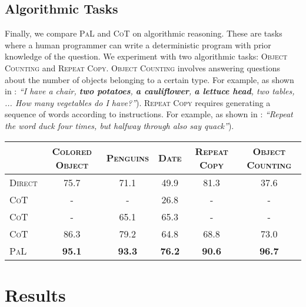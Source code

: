 \documentclass[dvipsnames]{article} \usepackage[accepted]{icml2022}
\newcommand{\ours}{\textsc{PaL}\xspace}
\newcommand{\cotp}{\textsc{CoT}\xspace}
\newcommand{\direct}{\textsc{Direct}\xspace}
\newcommand{\repeatcopy}{\textsc{Repeat Copy}\xspace}
\newcommand{\objectcounting}{\textsc{Object Counting}\xspace}
\begin{document}
 \subsection{Algorithmic Tasks}
\label{sec:algorithmic}
Finally, we compare \ours and \cotp on algorithmic reasoning. 
These are tasks where a human programmer can 
write a deterministic program with prior knowledge of the question.
We experiment with two algorithmic tasks: \objectcounting and \repeatcopy. 
 \objectcounting  involves answering questions about the number of objects belonging to a certain type. 
For example, as shown in : \textit{
``I have a chair, \textbf{two potatoes}, \textbf{a cauliflower}, \textbf{a lettuce head}, two tables, ... How many vegetables do I have?''}).
\repeatcopy requires generating a sequence of words according to instructions. 
For example, as shown in : \textit{``Repeat the word duck four times, but halfway through also say quack''}).






 
\begin{table*}[t]
    \centering
    \begin{tabular}{lccccc}
    \toprule
     & \textsc{Colored Object} & \textsc
{Penguins} & \textsc{Date} & \repeatcopy & \objectcounting \\ \midrule
    \direct & 75.7 & 71.1 & 49.9 & 81.3 & 37.6 \\
    \cotp & - & - & 26.8 & - & - \\
    \cotp & - & 65.1 & 65.3 & - & - \\    
    \cotp & 86.3 & 79.2 & 64.8 & 68.8 & 73.0 \\
    \ours & \textbf{95.1}  & \textbf{93.3} & \textbf{76.2} & \textbf{90.6} & \textbf{96.7} \\ \bottomrule
    \end{tabular}
    \caption{Solve rate on three symbolic reasoning datasets and two algorithmic datasets, 
    In all datasets, \ours achieves a much higher accuracy than chain-of-thought. Results with closed models LaMDA-137B and PaLM-540B are included if available to public~\cite{wei2022chain,Suzgun2022ChallengingBT}.
    }
    \label{tab:date_color_results}
\end{table*} 
\section{Results}
\label{sec:results}
\end{document}
